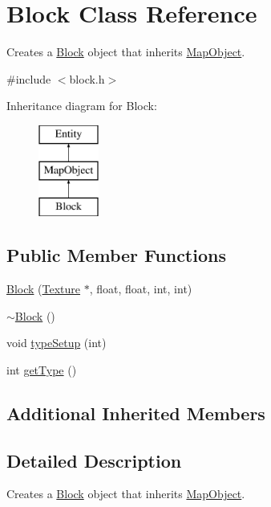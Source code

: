 \hypertarget{class_block}{\section{Block Class Reference}
\label{class_block}
}


Creates a \hyperlink{class_block}{Block} object that inherits \hyperlink{class_map_object}{Map\+Object}.  




{\ttfamily \#include $<$block.\+h$>$}

Inheritance diagram for Block\+:\begin{figure}[H]
\begin{center}
\leavevmode
\includegraphics[height=3.000000cm]{class_block}
\end{center}
\end{figure}
\subsection*{Public Member Functions}
\begin{DoxyCompactItemize}
\item 
\hyperlink{class_block_a3891a2f8968642512b5d2eeddc67131a}{Block} (\hyperlink{class_texture}{Texture} $\ast$, float, float, int, int)
\item 
\hyperlink{class_block_a19d1bd0e1cef6a865ed2745a2e648405}{$\sim$\+Block} ()
\item 
void \hyperlink{class_block_ae46fc2f3f732a601b6599bdc8250de3f}{type\+Setup} (int)
\item 
int \hyperlink{class_block_a87d881ecb3c498f68a5abff029b52188}{get\+Type} ()
\end{DoxyCompactItemize}
\subsection*{Additional Inherited Members}


\subsection{Detailed Description}
Creates a \hyperlink{class_block}{Block} object that inherits \hyperlink{class_map_object}{Map\+Object}. 

